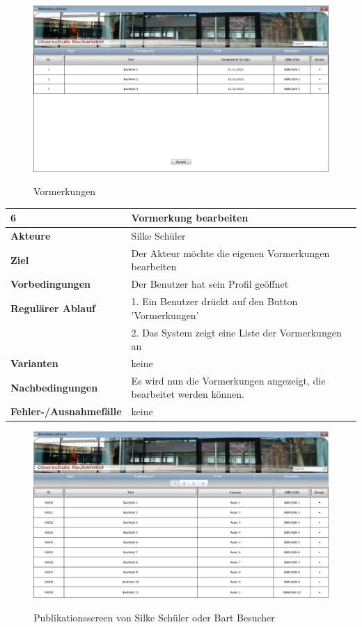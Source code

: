 \documentclass[fontsize=12pt,paper=a4,twoside]{scrartcl}
\begin{document}
\begin{figure}[htbp]
\caption{Vormerkungen}
\includegraphics[width=1\textwidth]{ScreensWebsite/VormerkungenSchueler.png}
  \label{Vormerkungen}
\end{figure}

\begin{table}[htbp]
\label{6}
\begin{tabular}{|l|p{10cm}|}
\hline 
\textbf{6} & \textbf{Vormerkung bearbeiten} \\ \hline
\textbf{Akteure} & Silke Schüler\\ \hline
\textbf{Ziel} & Der Akteur möchte die eigenen Vormerkungen bearbeiten  \\ \hline
\textbf{Vorbedingungen} & Der Benutzer hat sein Profil geöffnet  \\ \hline
\textbf{Regulärer Ablauf} & 
1. Ein Benutzer drückt auf den Button 'Vormerkungen' \\
&2. Das System zeigt eine Liste der Vormerkungen an\\
\hline
\textbf{Varianten} & 
keine \\ \hline
\textbf{Nachbedingungen} & Es wird nun die Vormerkungen angezeigt, die bearbeitet werden können.\\ 
\hline
\textbf{Fehler-/Ausnahmefälle} & keine\\
\hline
\end{tabular}
\end{table}

\begin{figure}[htbp]
\caption{Publikationsscreen von Silke Schüler oder Bart Besucher}
\includegraphics[width=1\textwidth]{ScreensWebsite/PublikationslisteLoggedInSchueler.png}
  \label{pub}
\end{figure}
\end{document}
